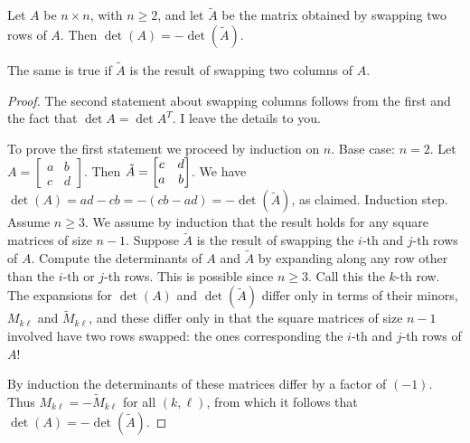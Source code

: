 \begin{frame}
\footnotesize
\begin{theorem}Let $A$ be $n\times n$, with $n\geq 2$, and let $\tilde{A}$ be the matrix obtained by swapping two rows of $A$. Then $\det(A)=-\det(\tilde{A})$. 

The same is true if $\tilde{A}$ is the result of swapping two columns of $A$. 
\end{theorem}
\pause
\begin{proof}
The second statement about swapping columns follows from the first and the fact that $\det A=\det A^T$. I leave the details to you. 

\pause
To prove the first statement we proceed by induction on $n$. 
\bpause
\alert{Base case: $n=2$.} Let $A=\begin{bmatrix}
a&b\\c&d
\end{bmatrix}$. Then $\tilde{A}=\begin{bmatrix}c&d\\ a&b \end{bmatrix}$. We have $\det(A)=ad-cb=-(cb-ad)=-\det(\tilde{A})$, as claimed. 
\bpause
\alert{Induction step.} Assume $n\geq 3$. We assume by induction that the result holds for any square matrices of size $n-1$.
\bpause 
Suppose $\tilde{A}$ is the result of swapping the $i$-th and $j$-th rows of $A$. Compute the determinants of $A$ and $\tilde{A}$ by expanding along \alert{any row other than the $i$-th or $j$-th rows}. This is possible since $n\geq 3$.  Call this the $k$-th row. 
\bpause 
The expansions for $\det(A)$ and $\det(\tilde{A})$ differ only in terms of their minors, $M_{k\ell}$ and $\tilde{M}_{k\ell}$, and these differ only in that the square matrices of size $n-1$ involved have two rows swapped: the ones corresponding the $i$-th and $j$-th rows of $A$! 

\bpause By induction the determinants of these matrices differ by a factor of $(-1)$. Thus $M_{k
\ell}=-\tilde{M}_{k\ell}$ for all $(k,\ell)$, from which it follows that 
$\det(A)=-\det(\tilde{A})$.  
\end{proof}
\end{frame}

